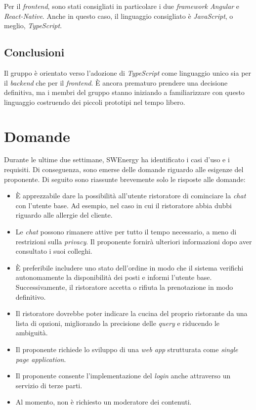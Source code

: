 Per il \textit{frontend}, sono stati consigliati in particolare i due
\textit{framework Angular} e \textit{React-Native}. Anche in questo caso, il
linguaggio consigliato è \textit{JavaScript}, o meglio, \textit{TypeScript}.

\subsection{Conclusioni}

Il gruppo è orientato verso l'adozione di \textit{TypeScript} come linguaggio
unico sia per il \textit{backend} che per il \textit{frontend}. È ancora 
prematuro prendere una decisione definitiva, ma i membri del gruppo
stanno iniziando a familiarizzare con questo linguaggio costruendo dei
piccoli prototipi nel tempo libero.

\section{Domande}

Durante le ultime due settimane, SWEnergy ha identificato i casi d'uso e i
requisiti. Di conseguenza, sono emerse delle domande riguardo alle esigenze
del proponente. Di seguito sono riassunte brevemente solo le risposte alle
domande:

\begin{itemize}
	\item È apprezzabile dare la possibilità all'utente ristoratore di
	      cominciare la \textit{chat} con l'utente base. Ad esempio, nel caso in cui il
	      ristoratore abbia dubbi riguardo alle allergie del cliente.

	\item Le \textit{chat} possono rimanere attive per tutto il tempo necessario, a meno
	      di restrizioni sulla \textit{privacy}. Il proponente fornirà ulteriori
	      informazioni dopo aver consultato i suoi colleghi.

	\item È preferibile includere uno stato dell'ordine in modo che il sistema
	      verifichi autonomamente la disponibilità dei posti e informi l'utente
	      base. Successivamente, il ristoratore accetta o rifiuta la
	      prenotazione in modo definitivo.

	\item Il ristoratore dovrebbe poter indicare la cucina del proprio
	      ristorante da una lista di opzioni, migliorando la precisione delle
	      \textit{query} e riducendo le ambiguità.

	\item Il proponente richiede lo sviluppo di una \textit{web app}
	      strutturata come \textit{single page application}.

	\item Il proponente consente l'implementazione del \textit{login} anche
	      attraverso un servizio di terze parti.

	\item Al momento, non è richiesto un moderatore dei contenuti.
\end{itemize}

